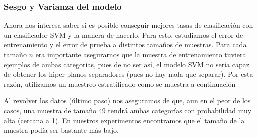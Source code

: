 \documentclass{article}
\begin{document}
\subsubsection{Sesgo y Varianza del modelo}
Ahora nos interesa saber si es posible conseguir mejores tasas de clasificación con un clasificador SVM y la manera de hacerlo. Para esto, estudiamos el error de entrenamiento y el error de prueba a distintos tamaños de muestras. Para cada tamaño $n$ era importante asegurarnos que la muestra de entrenamiento tuviera ejemplos de ambas categorías, pues de no ser así, el modelo SVM no sería capaz de obtener los hiper-planos separadores (pues no hay nada que separar). Por esta razón, utilizamos un muestreo estratificado como se muestra a continuación

Al revolver los datos (último paso) nos aseguramos de que, aun en el peor de los casos, una muestra de tamaño 49 tendrá ambas categorías con probabilidad muy alta (cercana a 1). En nuestros experimentos encontramos que el tamaño de la muestra podía ser bastante más bajo. 
\end{document}
